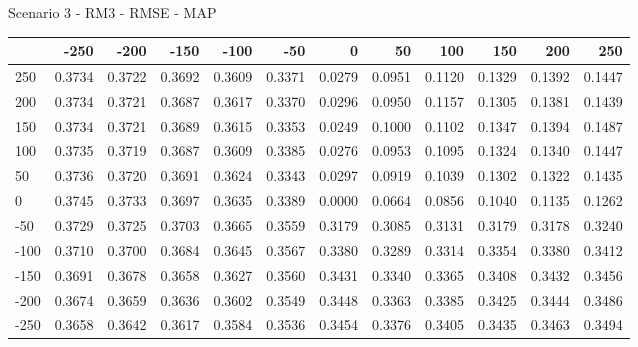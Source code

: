 Scenario 3 - RM3 - RMSE - MAP
\begin{tabular}{lrrrrrrrrrrr}
\toprule
{} &   -250 &   -200 &   -150 &   -100 &   -50  &    0   &    50  &    100 &    150 &    200 &    250 \\
\midrule
 250 & 0.3734 & 0.3722 & 0.3692 & 0.3609 & 0.3371 & 0.0279 & 0.0951 & 0.1120 & 0.1329 & 0.1392 & 0.1447 \\
 200 & 0.3734 & 0.3721 & 0.3687 & 0.3617 & 0.3370 & 0.0296 & 0.0950 & 0.1157 & 0.1305 & 0.1381 & 0.1439 \\
 150 & 0.3734 & 0.3721 & 0.3689 & 0.3615 & 0.3353 & 0.0249 & 0.1000 & 0.1102 & 0.1347 & 0.1394 & 0.1487 \\
 100 & 0.3735 & 0.3719 & 0.3687 & 0.3609 & 0.3385 & 0.0276 & 0.0953 & 0.1095 & 0.1324 & 0.1340 & 0.1447 \\
 50  & 0.3736 & 0.3720 & 0.3691 & 0.3624 & 0.3343 & 0.0297 & 0.0919 & 0.1039 & 0.1302 & 0.1322 & 0.1435 \\
 0   & 0.3745 & 0.3733 & 0.3697 & 0.3635 & 0.3389 & 0.0000 & 0.0664 & 0.0856 & 0.1040 & 0.1135 & 0.1262 \\
-50  & 0.3729 & 0.3725 & 0.3703 & 0.3665 & 0.3559 & 0.3179 & 0.3085 & 0.3131 & 0.3179 & 0.3178 & 0.3240 \\
-100 & 0.3710 & 0.3700 & 0.3684 & 0.3645 & 0.3567 & 0.3380 & 0.3289 & 0.3314 & 0.3354 & 0.3380 & 0.3412 \\
-150 & 0.3691 & 0.3678 & 0.3658 & 0.3627 & 0.3560 & 0.3431 & 0.3340 & 0.3365 & 0.3408 & 0.3432 & 0.3456 \\
-200 & 0.3674 & 0.3659 & 0.3636 & 0.3602 & 0.3549 & 0.3448 & 0.3363 & 0.3385 & 0.3425 & 0.3444 & 0.3486 \\
-250 & 0.3658 & 0.3642 & 0.3617 & 0.3584 & 0.3536 & 0.3454 & 0.3376 & 0.3405 & 0.3435 & 0.3463 & 0.3494 \\
\bottomrule
\end{tabular}

